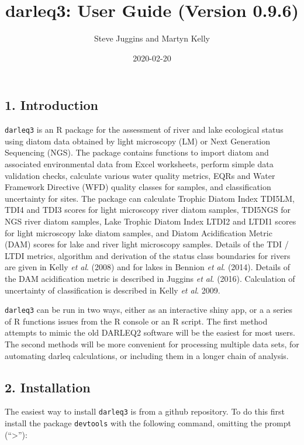 \documentclass[]{article}
\title{darleq3: User Guide (Version 0.9.6)}
\author{Steve Juggins and Martyn Kelly}
\date{2020-02-20}
\begin{document}
\maketitle

\subsection{1. Introduction}\label{introduction}

\texttt{darleq3} is an R package for the assessment of river and lake
ecological status using diatom data obtained by light microscopy (LM) or
Next Generation Sequencing (NGS). The package contains functions to
import diatom and associated environmental data from Excel worksheets,
perform simple data validation checks, calculate various water quality
metrics, EQRs and Water Framework Directive (WFD) quality classes for
samples, and classification uncertainty for sites. The package can
calculate Trophic Diatom Index TDI5LM, TDI4 and TDI3 scores for light
microscopy river diatom samples, TDI5NGS for NGS river diatom samples,
Lake Trophic Diatom Index LTDI2 and LTDI1 scores for light microscopy
lake diatom samples, and Diatom Acidification Metric (DAM) scores for
lake and river light microscopy samples. Details of the TDI / LTDI
metrics, algorithm and derivation of the status class boundaries for
rivers are given in Kelly \emph{et al}. (2008) and for lakes in Bennion
\emph{et al}. (2014). Details of the DAM acidification metric is
described in Juggins \emph{et al}. (2016). Calculation of uncertainty of
classification is described in Kelly \emph{et al}. 2009.

\texttt{darleq3} can be run in two ways, either as an interactive shiny
app, or a a series of R functions issues from the R console or an R
script. The first method attempts to mimic the old DARLEQ2 software will
be the easiest for most users. The second methods will be more
convenient for processing multiple data sets, for automating darleq
calculations, or including them in a longer chain of analysis.

\subsection{2. Installation}\label{installation}

The easiest way to install \texttt{darleq3} is from a github repository.
To do this first install the package \texttt{devtools} with the
following command, omitting the prompt (``\textgreater{}''):
\end{document}

